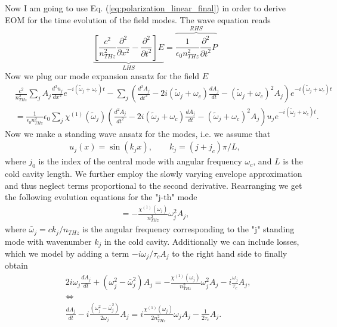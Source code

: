 \documentclass[preprint,secnumarabic,amssymb, nobibnotes, aip, prd]{revtex4-1}
\def\p{\partial}
\def\tw{\tilde{\omega}}
\def\p{\partial}
\def\tw{\tilde{\omega}}
\begin{document}
	
	Now I am going to use Eq. (\ref{eq:polarization_linear_final}) in order to derive EOM for the time evolution of the field modes. The wave equation reads
	\begin{equation}
	\label{eq:waveqns}
	\underbrace{\left [\frac{c^2}{n_{THz}^2} \frac{\p^2}{\p x^2} -\frac{\p^2}{\p t^2} \right ] E}_{LHS} =\overbrace{\frac{1}{\epsilon_0 n_{THz}^2}\frac{\p^2}{\p t^2}P}^{RHS}
	\end{equation}
	Now we plug our mode expansion ansatz for the field $E$ 
	\begin{align}
	\label{eq:waveqn2}
	&\frac{c^2}{n_{THz}^2} \sum_{j}A_j\frac{d^2u_j}{d x^2}e^{-i(\tw_j+\omega_c)t} -\sum_{j} \left(\frac{d^2 A_j}{d t^2}-2i(\tw_j+\omega_c)\frac{dA_j}{dt}-(\tw_j+\omega_c)^2A_j\right)e^{-i(\tw_j+\omega_c)t} \nonumber \\
	&=\frac{1}{\epsilon_0 n_{THz}^2}\epsilon_0 \sum_{j}\chi^{(1)}(\tilde{\omega}_j) \left (\frac{d^2 A_j}{d t^2}-2i(\tw_j+\omega_c)\frac{dA_j}{dt}-(\tw_j+\omega_c)^2A_j \right)u_je^{-i(\tw_j+\omega_c)t}.
	\end{align}
	Now we make a standing wave ansatz for the modes, i.e. we assume that 
	\begin{align}
	u_j(x) = \sin(k_j x), \quad \quad k_j = (j+j_c)\pi/L,
	\end{align}
	where $j_0$ is the index of the central mode with angular frequency $\omega_c$, and $L$ is the cold cavity length. We further employ the slowly varying envelope approximation and thus neglect terms proportional to the second derivative. Rearranging we get the following evolution equations for the "j-th" mode
	\begin{align}
	 [2i\omega_j \frac{dA_j}{dt} + (\omega_j^2 - \bar{\omega}_j^{2})A_j] = -\frac{\chi^{(1)}(\omega_j)}{n_{THz}^2}  \omega_j^2 A_j,
	\end{align}
	where $\bar\omega_j = ck_j/n_{THz}$ is the angular frequency corresponding to the "j" standing mode with wavenumber $k_j$ in the cold cavity. Additionally we can include losses, which we model by adding a term $-i\omega_j/\tau_c A_j$ to the right hand side to finally obtain
	\begin{align}
	& 2i\omega_j \frac{dA_j}{dt} + (\omega_j^2 - \bar{\omega}_j^{2})A_j = -\frac{\chi^{(1)}(\omega_j)}{n_{THz}^2}  \omega_j^2 A_j -i\frac{\omega_j}{\tau_c} A_j,  \nonumber \\
	& \Leftrightarrow \nonumber \\
	& \frac{dA_j}{dt} -i\frac{(\omega_j^2 - \bar{\omega}_j^{2})}{2\omega_j}A_j = i\frac{\chi^{(1)}(\omega_j)}{2n_{THz}^2}  \omega_j A_j -\frac{1}{2\tau_c} A_j. 
	\end{align}
\end{document}
